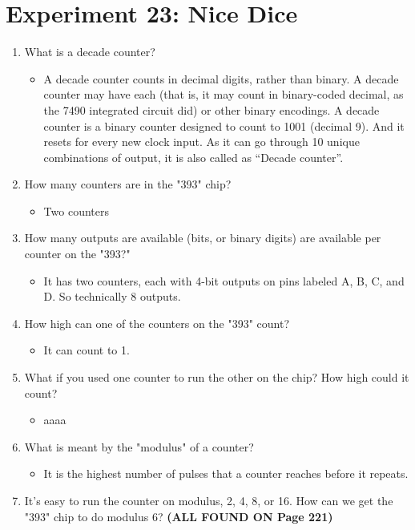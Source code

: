 \documentclass[pstricks,border=11pt]{article}
\begin{document}
\section{Experiment 23: Nice Dice}
\begin{enumerate}
    \item What is a decade counter?
    \begin{itemize}
        \item A decade counter counts in decimal digits, rather than binary. A decade counter may have each (that is, it may count in binary-coded decimal, as the 7490 integrated circuit did) or other binary encodings. A decade counter is a binary counter designed to count to 1001 (decimal 9). And it resets for every new clock input. As it can go through 10 unique combinations of output, it is also called as “Decade counter”.
    \end{itemize}
    \item How many counters are in the "393" chip?
    \begin{itemize}
        \item Two counters
    \end{itemize}
    \item How many outputs are available (bits, or binary digits) are available per counter on the "393?"
    \begin{itemize}
        \item It has two counters, each with 4-bit outputs on pins labeled A, B, C, and D. So technically 8 outputs.
    \end{itemize}
    \item How high can one of the counters on the "393" count?
    \begin{itemize}
        \item It can count to 1.
    \end{itemize}
    \item What if you used one counter to run the other on the chip? How high could it count?
    \begin{itemize}
        \item aaaa
    \end{itemize}
    \item What is meant by the "modulus" of a counter?
    \begin{itemize}
        \item It is the highest number of pulses that a counter reaches before it repeats.
    \end{itemize}
    \item It's easy to run the counter on modulus, 2, 4, 8, or 16. How can we get the "393" chip to do modulus 6? \textbf{(ALL FOUND ON Page 221)}

\end{enumerate}
\end{document}
